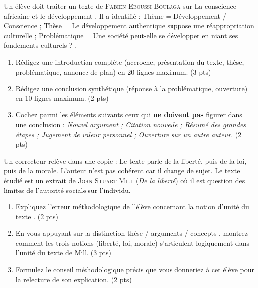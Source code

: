 \documentclass[11pt]{article}
\begin{document}
\begin{exercice}
Un élève doit traiter un texte de \textsc{Fabien Eboussi Boulaga} sur \og La conscience africaine et le développement \fg{}. Il a identifié : Thème = Développement / Conscience ; Thèse = Le développement authentique suppose une réappropriation culturelle ; Problématique = \og Une société peut-elle se développer en niant ses fondements culturels ? \fg{}.
\begin{enumerate}
    \item Rédigez une introduction complète (accroche, présentation du texte, thèse, problématique, annonce de plan) en 20 lignes maximum. (3 pts)
    \item Rédigez une conclusion synthétique (réponse à la problématique, ouverture) en 10 lignes maximum. (2 pts)
    \item Cochez parmi les éléments suivants ceux qui \textbf{ne doivent pas} figurer dans une conclusion : \textit{Nouvel argument ; Citation nouvelle ; Résumé des grandes étapes ; Jugement de valeur personnel ; Ouverture sur un autre auteur}. (2 pts)
\end{enumerate}
\end{exercice}

\begin{exercice}
Un correcteur relève dans une copie : \og Le texte parle de la liberté, puis de la loi, puis de la morale. L'auteur n'est pas cohérent car il change de sujet. \fg{} Le texte étudié est un extrait de \textsc{John Stuart Mill} (\textit{De la liberté}) où il est question des limites de l'autorité sociale sur l'individu.
\begin{enumerate}
    \item Expliquez l'erreur méthodologique de l'élève concernant la notion d'\og unité du texte \fg{}. (2 pts)
    \item En vous appuyant sur la distinction \og thèse / arguments / concepts \fg{}, montrez comment les trois notions (liberté, loi, morale) s'articulent logiquement dans l'unité du texte de Mill. (3 pts)
    \item Formulez le conseil méthodologique précis que vous donneriez à cet élève pour la relecture de son explication. (2 pts)
\end{enumerate}
\end{exercice}
\end{document}
